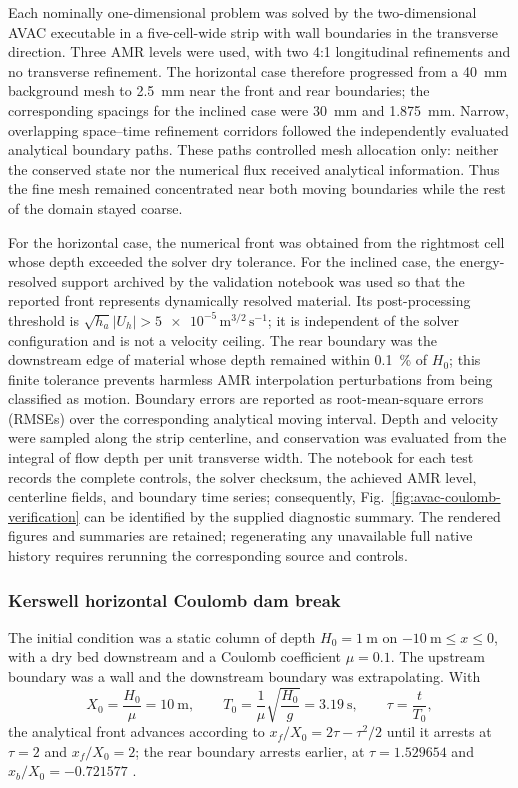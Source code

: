 \documentclass[11pt,a4paper]{article}
\begin{document}
Each nominally one-dimensional problem was solved by the two-dimensional AVAC
executable in a five-cell-wide strip with wall boundaries in the transverse
direction.  Three AMR levels were used, with two 4:1 longitudinal refinements
and no transverse refinement.  The horizontal case therefore progressed from
a \SI{40}{\milli\metre} background mesh to \SI{2.5}{\milli\metre} near the
front and rear boundaries; the corresponding spacings for the inclined case
were \SI{30}{\milli\metre} and \SI{1.875}{\milli\metre}.  Narrow,
overlapping space--time refinement corridors followed the independently
evaluated analytical boundary paths.  These paths controlled mesh allocation
only: neither the conserved state nor the numerical flux received analytical
information.  Thus the fine mesh remained concentrated near both moving
boundaries while the rest of the domain stayed coarse.

For the horizontal case, the numerical front was obtained from the rightmost
cell whose depth exceeded the solver dry tolerance.  For the inclined case,
the energy-resolved support archived by the validation notebook was used so
that the reported front represents dynamically resolved material. Its
post-processing threshold is
$\sqrt{h_a}|U_h|>\num{5e-5}\,\mathrm{m}^{3/2}\,\mathrm{s}^{-1}$; it is
independent of the solver configuration and is not a velocity ceiling. The rear
boundary was the downstream
edge of material whose depth remained within \SI{0.1}{\percent} of $H_0$; this
finite tolerance prevents harmless AMR interpolation perturbations from being
classified as motion.  Boundary errors are
reported as root-mean-square errors (RMSEs) over the corresponding analytical
moving interval.  Depth and velocity were sampled along the strip centerline,
and conservation was evaluated from the integral of flow depth per unit
transverse width.  The notebook for each test records the complete controls,
the solver checksum, the achieved AMR level, centerline fields, and boundary
time series; consequently, Fig.~\ref{fig:avac-coulomb-verification} can be
identified by the supplied diagnostic summary. The rendered figures and
summaries are retained; regenerating any unavailable full native history
requires rerunning the corresponding source and controls.

\subsubsection{Kerswell horizontal Coulomb dam break}

The initial condition was a static column of depth $H_0=\SI{1}{\metre}$ on
$-\SI{10}{\metre}\leq x\leq0$, with a dry bed downstream and a Coulomb
coefficient $\mu=0.1$.  The upstream boundary was a wall and the downstream
boundary was extrapolating.  With
\begin{equation}
  X_0=\frac{H_0}{\mu}=\SI{10}{\metre},\qquad
  T_0=\frac{1}{\mu}\sqrt{\frac{H_0}{g}}=\SI{3.19}{\second},\qquad
  \tau=\frac{t}{T_0},
  \label{eq:kerswell-scales}
\end{equation}
the analytical front advances according to
$x_f/X_0=2\tau-\tau^2/2$ until it arrests at $\tau=2$ and
$x_f/X_0=2$; the rear boundary arrests earlier, at
$\tau=1.529654$ and $x_b/X_0=-0.721577$ \citep{Kerswell2005}.
\end{document}
